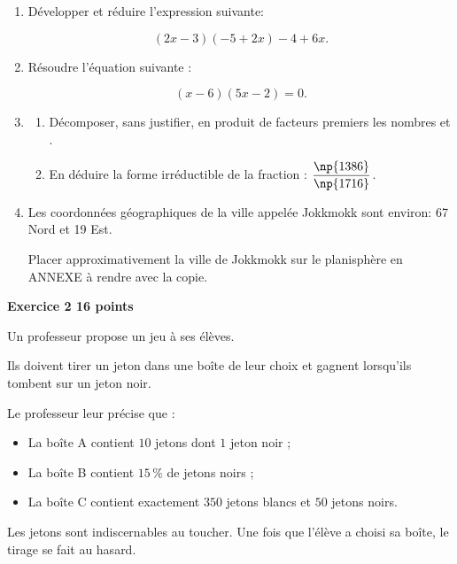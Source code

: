 \documentclass[11pt]{article}
\begin{document}
\begin{enumerate}
\item Développer et réduire l'expression suivante:

\[(2x - 3)(- 5 + 2x) - 4 + 6x.\]

\item Résoudre l'équation suivante : 

\[(x - 6)(5x - 2) = 0.\]

\item 
	\begin{enumerate}
		\item Décomposer, sans justifier, en produit de facteurs premiers les nombres  et .
		\item En déduire la forme irréductible de la fraction : $\dfrac{\np{1386}}{\np{1716}}$.
	\end{enumerate}
\item Les coordonnées géographiques de la ville appelée Jokkmokk sont environ: 67\degres{} Nord et 19\degres{} Est. 

Placer approximativement la ville de Jokkmokk sur le planisphère en ANNEXE à rendre avec la copie.
\end{enumerate}

\bigskip

\textbf{Exercice 2 \hfill 16 points}

\medskip

Un professeur propose un jeu à ses élèves.

Ils doivent tirer un jeton dans une boîte de leur choix et gagnent lorsqu'ils tombent sur un jeton noir.

Le professeur leur précise que :

\setlength\parindent{1cm}
\begin{itemize}
\item La boîte A contient $10$ jetons dont $1$ jeton noir ;
\item La boîte B contient $15$\,\% de jetons noirs ;
\item La boîte C contient exactement $350$ jetons blancs et $50$ jetons noirs.
\end{itemize}
\setlength\parindent{0cm}

\medskip

Les jetons sont indiscernables au toucher. Une fois que l'élève a choisi sa boîte, le tirage se fait au hasard.

\medskip
\end{document}
